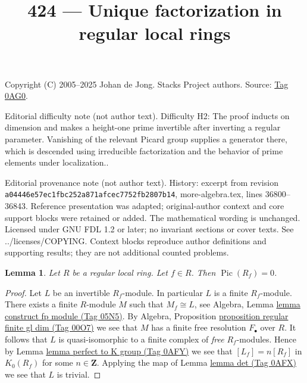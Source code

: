 \documentclass{amsart}
\theoremstyle{plain}
\newtheorem{lemma}[subsection]{Lemma}
\theoremstyle{definition}
\theoremstyle{remark}
\numberwithin{equation}{subsection}
\def\Pic{\mathop{\mathrm{Pic}}\nolimits}
\begin{document}
\title[Stacks Project, Tag 0AG0]{424 --- Unique factorization in regular local rings}
\maketitle
\noindent Copyright (C) 2005--2025 Johan de Jong. Stacks Project authors. Source: \href{https://stacks.math.columbia.edu/tag/0AG0}{Tag 0AG0}.

\noindent Editorial difficulty note (not author text). Difficulty H2: The proof inducts on dimension and makes a height-one prime invertible after inverting a regular parameter. Vanishing of the relevant Picard group supplies a generator there, which is descended using irreducible factorization and the behavior of prime elements under localization..

\noindent Editorial provenance note (not author text). History: excerpt from revision \texttt{a0444\allowbreak 6e57e\allowbreak c1fbc\allowbreak 252a8\allowbreak 71afc\allowbreak ec775\allowbreak 2fb28\allowbreak 07b14}, more-algebra.tex, lines 36800--36843. Reference presentation was adapted; original-author context and core support blocks were retained or added. The mathematical wording is unchanged. Licensed under GNU FDL 1.2 or later; no invariant sections or cover texts. See ../licenses/COPYING. Context blocks reproduce author definitions and supporting results; they are not additional counted problems.

\begin{lemma}
\label{lemma-regular-local-Pic-zero}
Let $R$ be a regular local ring. Let $f \in R$.
Then $\Pic(R_f) = 0$.
\end{lemma}

\begin{proof}
Let $L$ be an invertible $R_f$-module. In particular $L$ is
a finite $R_f$-module. There exists a finite $R$-module
$M$ such that $M_f \cong L$, see
Algebra, Lemma \href{https://stacks.math.columbia.edu/tag/05N5}{lemma construct fp module (Tag 05N5)}.
By Algebra, Proposition \href{https://stacks.math.columbia.edu/tag/00O7}{proposition regular finite gl dim (Tag 00O7)}
we see that $M$ has a finite free resolution $F_\bullet$ over $R$.
It follows that $L$ is quasi-isomorphic to a finite complex
of {\it free} $R_f$-modules. Hence by
Lemma \href{https://stacks.math.columbia.edu/tag/0AFY}{lemma perfect to K group (Tag 0AFY)} we see that
$[L_f] = n[R_f]$ in $K_0(R_f)$ for some $n \in \mathbf{Z}$.
Applying the map of Lemma \href{https://stacks.math.columbia.edu/tag/0AFX}{lemma det (Tag 0AFX)}
we see that $L$ is trivial.
\end{proof}
\end{document}

